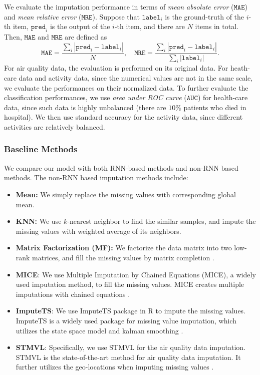 \documentclass{article}
\begin{document}
We evaluate the imputation performance
in terms of {\em mean absolute error} ($\mathtt{MAE}$) and {\em mean relative error} ($\mathtt{MRE}$). Suppose that $\mathtt{label}_i$ is the ground-truth of the $i$-th  item, $\mathtt{pred}_i$ is the output of the $i$-th item, and 
there are $N$ items in total. Then, $\mathtt{MAE}$ and $\mathtt{MRE}$ are defined as
$$\mathtt{MAE} = \frac{\sum_i |\mathtt{pred}_i - \mathtt{label}_i|}{N}, \quad \mathtt{MRE} = \frac{\sum_i |\mathtt{pred}_i - \mathtt{label}_i|}{\sum_i  |\mathtt{label}_i|}.$$
For air quality data, the evaluation is performed on its original data. For
 heath-care data and activity data, since the numerical values are not in the same scale, we evaluate the performances on their normalized data. To further evaluate the classification performances, we use {\em area under ROC curve} ($\mathtt{AUC}$) \cite{bradley1997use} for health-care data, since such data is highly unbalanced (there are $10\%$ patients who died in hospital). We then use standard accuracy for the activity data, since different activities are relatively balanced.
 
\subsubsection{Baseline Methods}
We compare our model with both RNN-based methods and non-RNN based methods. The non-RNN based imputation methods include:
\begin{itemize}
\item {\bf Mean:} We simply replace the missing values with corresponding global mean.
\item {\bf KNN:} We use $k$-nearest neighbor \cite{friedman2001elements} to find the similar samples, and impute the missing values with  weighted average of its neighbors. 
\item {\bf Matrix Factorization (MF):} We factorize the data matrix into two low-rank matrices, and fill the missing values by matrix completion \cite{friedman2001elements}.

\item {\bf MICE}: We use Multiple Imputation by Chained Equations (MICE), a widely used imputation method, to fill the missing values. MICE creates multiple imputations with chained equations \cite{azur2011multiple}.

\item {\bf ImputeTS}: We use ImputeTS package in R to impute the missing values. ImputeTS is a widely used package for missing value imputation, which utilizes the state space model and kalman smoothing \cite{RJ-2017-009}.

\item {\bf STMVL}: Specifically, we use STMVL for  the air quality data imputation. STMVL is the state-of-the-art method for air quality data imputation. It further utilizes the geo-locations when imputing missing values  \cite{yi2016st}.
\end{itemize}
\end{document}
